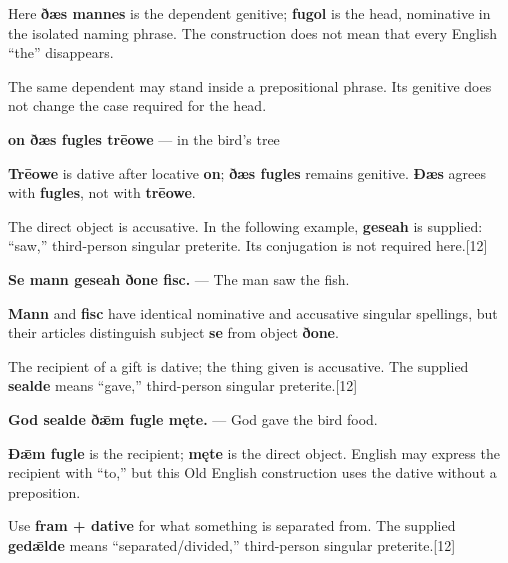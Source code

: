 Here \textbf{ðæs mannes} is the dependent genitive; \textbf{fugol} is the head, nominative in the isolated naming phrase. The construction does not mean that every English “the” disappears.

The same dependent may stand inside a prepositional phrase. Its genitive does not change the case required for the head.

\textbf{on ðæs fugles trēowe} — in the bird's tree

\textbf{Trēowe} is dative after locative \textbf{on}; \textbf{ðæs fugles} remains genitive. \textbf{Ðæs} agrees with \textbf{fugles}, not with \textbf{trēowe}.

The direct object is accusative. In the following example, \textbf{geseah} is supplied: “saw,” third-person singular preterite. Its conjugation is not required here.[12]

\textbf{Se mann geseah ðone fisc.} — The man saw the fish.

\textbf{Mann} and \textbf{fisc} have identical nominative and accusative singular spellings, but their articles distinguish subject \textbf{se} from object \textbf{ðone}.

The recipient of a gift is dative; the thing given is accusative. The supplied \textbf{sealde} means “gave,” third-person singular preterite.[12]

\textbf{God sealde ðǣm fugle męte.} — God gave the bird food.

\textbf{Ðǣm fugle} is the recipient; \textbf{męte} is the direct object. English may express the recipient with “to,” but this Old English construction uses the dative without a preposition.

Use \textbf{fram + dative} for what something is separated from. The supplied \textbf{gedǣlde} means “separated/\allowbreak{}divided,” third-person singular preterite.[12]

